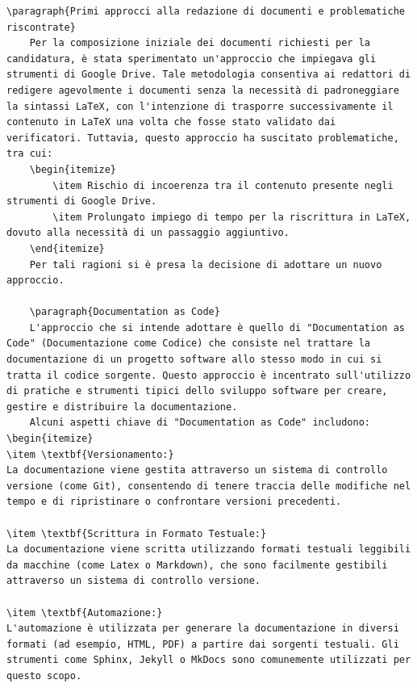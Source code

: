 \documentclass{article}
\begin{document}
\begin{enumerate}
\begin{lstlisting}[style=code]
    \paragraph{Primi approcci alla redazione di documenti e problematiche riscontrate}
    Per la composizione iniziale dei documenti richiesti per la candidatura, è stata sperimentato un'approccio che impiegava gli strumenti di Google Drive. Tale metodologia consentiva ai redattori di redigere agevolmente i documenti senza la necessità di padroneggiare la sintassi LaTeX, con l'intenzione di trasporre successivamente il contenuto in LaTeX una volta che fosse stato validato dai verificatori. Tuttavia, questo approccio ha suscitato problematiche, tra cui:
    \begin{itemize}
        \item Rischio di incoerenza tra il contenuto presente negli strumenti di Google Drive.
        \item Prolungato impiego di tempo per la riscrittura in LaTeX, dovuto alla necessità di un passaggio aggiuntivo. 
    \end{itemize}
    Per tali ragioni si è presa la decisione di adottare un nuovo approccio.

    \paragraph{Documentation as Code}
    L'approccio che si intende adottare è quello di "Documentation as Code" (Documentazione come Codice) che consiste nel trattare la documentazione di un progetto software allo stesso modo in cui si tratta il codice sorgente. Questo approccio è incentrato sull'utilizzo di pratiche e strumenti tipici dello sviluppo software per creare, gestire e distribuire la documentazione.
    Alcuni aspetti chiave di "Documentation as Code" includono:
\begin{itemize}
\item \textbf{Versionamento:}
La documentazione viene gestita attraverso un sistema di controllo versione (come Git), consentendo di tenere traccia delle modifiche nel tempo e di ripristinare o confrontare versioni precedenti.

\item \textbf{Scrittura in Formato Testuale:}
La documentazione viene scritta utilizzando formati testuali leggibili da macchine (come Latex o Markdown), che sono facilmente gestibili attraverso un sistema di controllo versione.

\item \textbf{Automazione:}
L'automazione è utilizzata per generare la documentazione in diversi formati (ad esempio, HTML, PDF) a partire dai sorgenti testuali. Gli strumenti come Sphinx, Jekyll o MkDocs sono comunemente utilizzati per questo scopo.


\end{lstlisting}
\end{enumerate}
\end{document}
